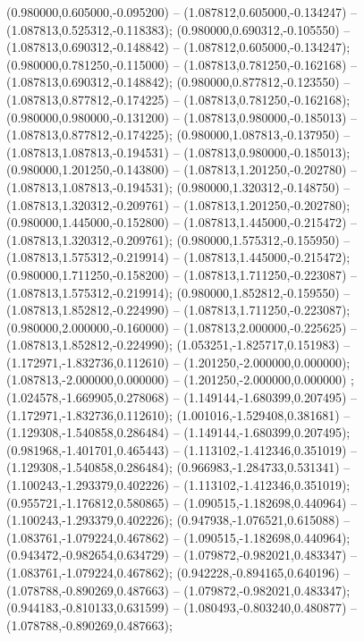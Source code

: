  (0.980000,0.605000,-0.095200) -- (1.087812,0.605000,-0.134247) -- (1.087813,0.525312,-0.118383);
 (0.980000,0.690312,-0.105550) -- (1.087813,0.690312,-0.148842) -- (1.087812,0.605000,-0.134247);
 (0.980000,0.781250,-0.115000) -- (1.087813,0.781250,-0.162168) -- (1.087813,0.690312,-0.148842);
 (0.980000,0.877812,-0.123550) -- (1.087813,0.877812,-0.174225) -- (1.087813,0.781250,-0.162168);
 (0.980000,0.980000,-0.131200) -- (1.087813,0.980000,-0.185013) -- (1.087813,0.877812,-0.174225);
 (0.980000,1.087813,-0.137950) -- (1.087813,1.087813,-0.194531) -- (1.087813,0.980000,-0.185013);
 (0.980000,1.201250,-0.143800) -- (1.087813,1.201250,-0.202780) -- (1.087813,1.087813,-0.194531);
 (0.980000,1.320312,-0.148750) -- (1.087813,1.320312,-0.209761) -- (1.087813,1.201250,-0.202780);
 (0.980000,1.445000,-0.152800) -- (1.087813,1.445000,-0.215472) -- (1.087813,1.320312,-0.209761);
 (0.980000,1.575312,-0.155950) -- (1.087813,1.575312,-0.219914) -- (1.087813,1.445000,-0.215472);
 (0.980000,1.711250,-0.158200) -- (1.087813,1.711250,-0.223087) -- (1.087813,1.575312,-0.219914);
 (0.980000,1.852812,-0.159550) -- (1.087813,1.852812,-0.224990) -- (1.087813,1.711250,-0.223087);
 (0.980000,2.000000,-0.160000) -- (1.087813,2.000000,-0.225625) -- (1.087813,1.852812,-0.224990);
 (1.053251,-1.825717,0.151983) -- (1.172971,-1.832736,0.112610) -- (1.201250,-2.000000,0.000000);
 (1.087813,-2.000000,0.000000) -- (1.201250,-2.000000,0.000000) ;
 (1.024578,-1.669905,0.278068) -- (1.149144,-1.680399,0.207495) -- (1.172971,-1.832736,0.112610);
 (1.001016,-1.529408,0.381681) -- (1.129308,-1.540858,0.286484) -- (1.149144,-1.680399,0.207495);
 (0.981968,-1.401701,0.465443) -- (1.113102,-1.412346,0.351019) -- (1.129308,-1.540858,0.286484);
 (0.966983,-1.284733,0.531341) -- (1.100243,-1.293379,0.402226) -- (1.113102,-1.412346,0.351019);
 (0.955721,-1.176812,0.580865) -- (1.090515,-1.182698,0.440964) -- (1.100243,-1.293379,0.402226);
 (0.947938,-1.076521,0.615088) -- (1.083761,-1.079224,0.467862) -- (1.090515,-1.182698,0.440964);
 (0.943472,-0.982654,0.634729) -- (1.079872,-0.982021,0.483347) -- (1.083761,-1.079224,0.467862);
 (0.942228,-0.894165,0.640196) -- (1.078788,-0.890269,0.487663) -- (1.079872,-0.982021,0.483347);
 (0.944183,-0.810133,0.631599) -- (1.080493,-0.803240,0.480877) -- (1.078788,-0.890269,0.487663);

